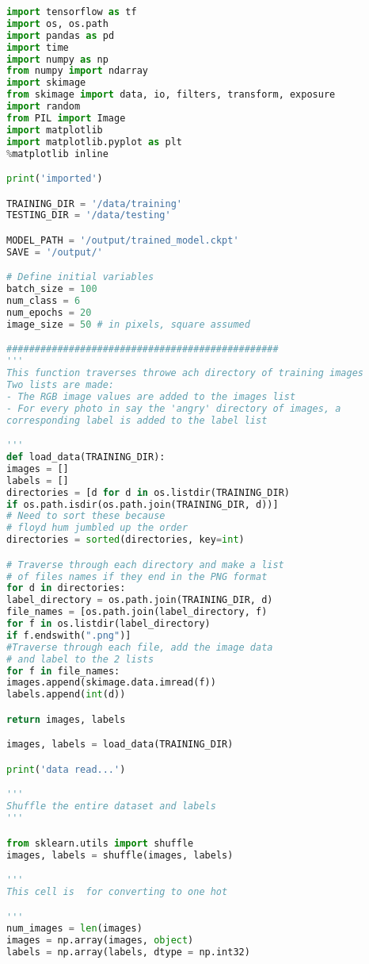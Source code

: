 \begin{lstlisting}[language=python, frame=single]
import tensorflow as tf
import os, os.path
import pandas as pd
import time
import numpy as np
from numpy import ndarray
import skimage
from skimage import data, io, filters, transform, exposure
import random
from PIL import Image
import matplotlib
import matplotlib.pyplot as plt
%matplotlib inline

print('imported')

TRAINING_DIR = '/data/training'
TESTING_DIR = '/data/testing'

MODEL_PATH = '/output/trained_model.ckpt'
SAVE = '/output/'

# Define initial variables
batch_size = 100
num_class = 6
num_epochs = 20
image_size = 50 # in pixels, square assumed

################################################
'''
This function traverses throwe ach directory of training images
Two lists are made:
- The RGB image values are added to the images list
- For every photo in say the 'angry' directory of images, a 
corresponding label is added to the label list

'''
def load_data(TRAINING_DIR):
images = []
labels = []
directories = [d for d in os.listdir(TRAINING_DIR) 
if os.path.isdir(os.path.join(TRAINING_DIR, d))]
# Need to sort these because
# floyd hum jumbled up the order
directories = sorted(directories, key=int)

# Traverse through each directory and make a list
# of files names if they end in the PNG format
for d in directories:
label_directory = os.path.join(TRAINING_DIR, d)
file_names = [os.path.join(label_directory, f) 
for f in os.listdir(label_directory) 
if f.endswith(".png")]
#Traverse through each file, add the image data
# and label to the 2 lists
for f in file_names:
images.append(skimage.data.imread(f))
labels.append(int(d))

return images, labels

images, labels = load_data(TRAINING_DIR)

print('data read...')

'''
Shuffle the entire dataset and labels
'''

from sklearn.utils import shuffle
images, labels = shuffle(images, labels)

'''
This cell is  for converting to one hot

'''
num_images = len(images)
images = np.array(images, object)
labels = np.array(labels, dtype = np.int32)


\end{lstlisting}
